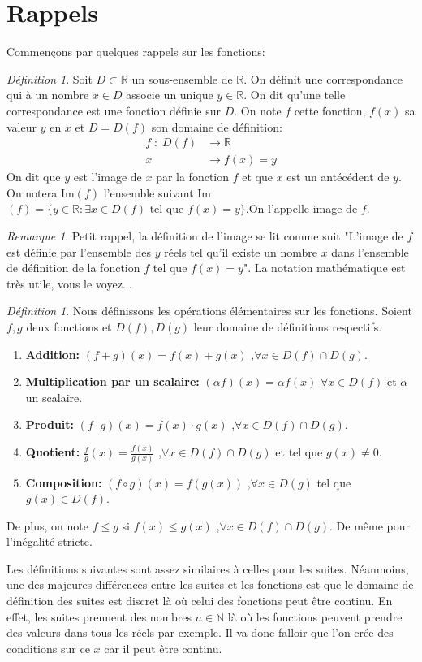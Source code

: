 \documentclass[oneside,12pt,french,table]{book}
\theoremstyle{definition}
\theoremstyle{plain}
\theoremstyle{remark}
\newtheorem{remark}[definition]{Remarque}
\newtheorem{defi}[definition]{Définition}
\newcommand{\Nn}{{\mathbb{N}}}
\newcommand{\Rr}{{\mathbb{R}}}
\begin{document}
\section{Rappels}
Commençons par quelques rappels sur les fonctions: 
\begin{defi}
    Soit $D\subset \Rr$ un sous-ensemble de $\Rr$. On définit une correspondance qui à un nombre $x\in D$ associe un unique $y\in \Rr$. On dit qu'une telle correspondance est une fonction définie sur $D$. On note $f$ cette fonction, $f(x)$ sa valeur $y$ en $x$ et $D=D(f)$ son domaine de définition: 
    \begin{align*}
        f\; : \; D(f)&\longrightarrow \Rr\\
        x\; &\longrightarrow f(x)=y
    \end{align*}
  On dit que $y$ est l'image de $x$ par la fonction $f$ et que $x$ est un antécédent de $y$. On notera Im$(f)$ l'ensemble suivant Im$(f)=\{y\in \Rr : \exists x \in D(f) \text{ tel que } f(x)=y\}$.On l'appelle image de $f$.

\end{defi}
\begin{remark}
 Petit rappel, la définition de l'image se lit comme suit "L'image de $f$ est définie par l'ensemble des $y$ réels tel qu'il existe un nombre $x$ dans l'ensemble de définition de la fonction $f$ tel que $f(x)=y$". La notation mathématique est très utile, vous le voyez...     
\end{remark}
 
\begin{defi}
    Nous définissons les opérations élémentaires sur les fonctions. Soient $f,g$ deux fonctions et $D(f), D(g)$ leur domaine de définitions respectifs. 
    \begin{enumerate}
        \item \textbf{Addition:} $(f+g)(x)=f(x)+g(x)$ ,$\forall x \in D(f)\cap D(g)$.
        \item \textbf{Multiplication par un scalaire:} $(\alpha f)(x)=\alpha f(x)$ $\forall x\in D(f)$ et $\alpha$ un scalaire.
        \item \textbf{Produit:} $(f\cdot g)(x)=f(x)\cdot g(x)$ ,$\forall x \in D(f)\cap D(g)$.
        \item \textbf{Quotient:} $\frac{f}{g}(x)=\frac{f(x)}{g(x)}$ ,$\forall x \in D(f)\cap D(g)$ et tel que $g(x)\neq 0$.
        \item \textbf{Composition:} $(f\circ g)(x)=f(g(x))$ ,$\forall x \in D(g)$ tel que $g(x)\in D(f)$.
    \end{enumerate}
    De plus, on note $f\leq g$ si $f(x)\leq g(x)$ ,$\forall x \in D(f)\cap D(g)$. De même pour l'inégalité stricte. 
\end{defi}
Les définitions suivantes sont assez similaires à celles pour les suites. Néanmoins, une des majeures différences entre les suites et les fonctions est que le domaine de définition des suites est discret là où celui des fonctions peut être continu. En effet, les suites prennent des nombres $n\in \Nn$ là où les fonctions peuvent prendre des valeurs dans tous les réels par exemple. Il va donc falloir que l'on crée des conditions sur ce $x$ car il peut être continu.
\end{document}
